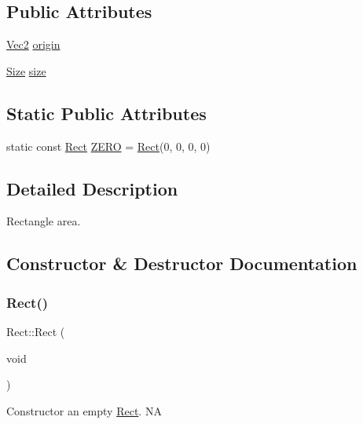\subsection*{Public Attributes}
\begin{DoxyCompactItemize}
\item 
\hyperlink{classVec2}{Vec2} \hyperlink{classRect_a44eeaed15ccbe8bc0427c4918bb64e97}{origin}
\item 
\hyperlink{classSize}{Size} \hyperlink{classRect_a997eb36f3e6c8c4428839a1550f2e4e1}{size}
\end{DoxyCompactItemize}
\subsection*{Static Public Attributes}
\begin{DoxyCompactItemize}
\item 
static const \hyperlink{classRect}{Rect} \hyperlink{classRect_a590be46e60027b2ca0f62a457f91a83e}{Z\+E\+RO} = \hyperlink{classRect}{Rect}(0, 0, 0, 0)
\end{DoxyCompactItemize}


\subsection{Detailed Description}
Rectangle area. 

\subsection{Constructor \& Destructor Documentation}
\mbox{\label{classRect_a911e531b86de33734dd7de3456722115}} 
\subsubsection{\texorpdfstring{Rect()}{Rect()}\hspace{0.1cm}{\footnotesize\ttfamily [1/8]}}
{\footnotesize\ttfamily Rect\+::\+Rect (\begin{DoxyParamCaption}\item[{void}]{ }\end{DoxyParamCaption})}

Constructor an empty \hyperlink{classRect}{Rect}.  NA \mbox{\label{classRect_a2ccad9ce15ee46a8957448a0bafbb8e9}} 
